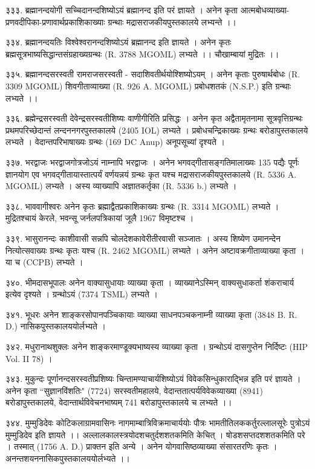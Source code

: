 ३३३. ब्रह्मानन्दयोगी
सच्चिदानन्दशिष्योऽयं ब्रह्मानन्द इति परं ज्ञायते । अनेन कृता आत्मबोधव्याख्या-प्रणवदीपिका-प्रणावार्थप्रकाशिकाख्याः ग्रन्थाः मद्रासराजकीयपुस्तकालये लभ्यन्ते ।।

३३४. ब्रह्मानन्दयतिः
विश्वेश्वरानन्दशिष्योऽयं ब्रह्मानन्द इति ज्ञायते । अनेन कृतः ब्रह्मसूत्रभाष्यसिद्धान्तसंग्रहाख्यग्रन्थः (R. 3788 MGOML) लभ्यते ।। चौखाम्बायां मुद्रितः ।।

३३५. ब्रह्मानन्दसरस्वती
रामराजसरस्वती - सदाशिवतीर्थयोश्शिष्योऽयम् । अनेन कृताः पुरुषार्थबोधः (R. 3309 MGOML) शिवगीताव्याख्या (R. 926 A. MGOML) प्रबोधशतकं (N.S.P.) इति ग्रन्थाः लभ्यते ।।

३३६. ब्रह्मेन्द्रसरस्वती
देवेन्द्रसरस्वतीशिष्यः वाणीगीरिति प्रसिद्धः । अनेन कृत अद्वैतामृतनामा सूत्रवृत्तिग्रन्थः प्रथमपरिच्छेदान्तं लन्दननगरपुस्तकालये (2405 IOL) लभ्यते । प्रबोधचन्द्रिकाख्यः ग्रन्थः बरोडापुस्तकालये लभ्यते । वेदान्तपरिभाषाख्यः ग्रन्थः (169 DC Anup) अनूपसूच्यां दृश्यते ।

३३७. भरद्वाजः
भरद्वाजगोत्रजोऽयं नाम्नापि भरद्वाजः । अनेन भगवद्गीतासङ्गतिमालाख्यः 135 पद्यैः पूर्णः ज्ञानयोग एव भगवद्गीतायास्तात्पर्यं वर्णयन्नयं ग्रन्थः कृत यश्च मद्रासराजकीयपुस्तकालये (R. 5336 A. MGOML) लभ्यते । अस्य व्याख्यापि अज्ञातकर्तृका (R. 5336 b.) लभ्यते ।

३३८. भाववागीश्वरः
अनेन कृतः ब्रह्माद्वैतप्रकाशिकाख्यः ग्रन्थः (R. 3314 MGOML) लभ्यते । मुद्रितश्चायं केरले, भवन्सू जर्नलपत्रिकायां जूलै 1967 विमृष्टश्च ।

३३९. भासुरानन्दः
काशीवासी सन्नपि चोलदेशकावेरीतीरवासी सञ्जातः । अस्य शिष्येण उमानन्देन नित्योत्सवाख्यः ग्रन्थः कृतः यश्च (R. 2462 MGOML) लभ्यते । अनेन अष्टावक्रगीताव्याख्या कृता । या च (CCPB) लभ्यते ।

३४०. भीमदासभूपालः
अनेन वाक्यासुधायाः व्याख्या कृता । व्याख्यानेऽस्मिन् वाक्यसुधाकर्ता शंकराचार्य इत्येव दृश्यते । ग्रन्थोऽयं (7374 TSML) लभ्यते ।

३४१. भूधरः
अनेन शाङ्करसोपानपञ्चिकायाः व्याख्या साधनपञ्चकनाम्नी व्याख्या कृता (3848 B. R. D.) नासिकपुस्तकालययोर्लभ्यते ।

३४२. मधुरानाथशुक्लः
अनेन शाङ्करमाण्डूक्यभाष्यस्य व्याख्या कृता । ग्रन्थोऽयं दासगुप्तेन निर्दिष्टः (HIP Vol. II 78) ।

३४३. मुकुन्दः
पूर्णानन्दसरस्वतीप्रशिष्यः चिन्तामण्याचार्यशिष्योऽयं विवेकसिन्धुकाराद्भिन्न इति परं ज्ञायते । अनेन कृता ``सुज्ञानविंशतिः" (7724) सरस्वतीमहालये, वेदान्ततात्पर्यविवेकव्याख्या (8941) बरोडापुस्तकालये, वेदान्तार्थविवेचनभाष्यम् 741 बरोडापुस्तकालये च लभ्यते ।।

३४४. मुम्मुडिदेवः
कोटिकलाग्रामवासिनः नागमाम्बात्रिविक्रमाचार्ययोः पौत्रः भामतीतिलककर्तुरल्लालसूरेः पुत्रोऽयं मुम्मुडिदेव इति ज्ञायते ।। अल्लालकालस्त्रयोदशचतुर्दशशतकमिति केचित् । षोडशसप्तदशशतकमिति परे । तस्मात् (1756 A. D.) प्राक्तन इति अन्ये । अनेन योगवासिष्ठव्याख्या संसारतरणिः कृतः । अनन्तशयननासिकपुस्तकालययोर्लभ्यते ।।

